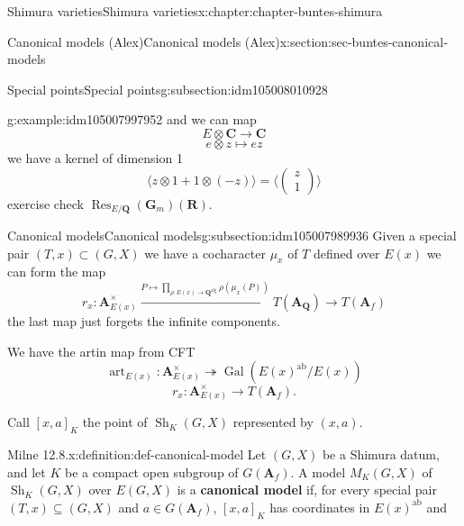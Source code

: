 \documentclass[oneside,10pt,]{book}
\newcommand{\terminology}[1]{\textbf{#1}}
\numberwithin{equation}{section}
\newcommand{\lb}{[}
\newcommand{\rb}{]}
\newcommand{\QQ}{\mathbf{Q}}
\newcommand{\RR}{\mathbf{R}}
\newcommand{\CC}{\mathbf{C}}
\newcommand{\adeles}{\mathbf{A}}
\newcommand{\alg}{\mathrm{alg}}
\newcommand{\ab}{\mathrm{ab}}
\newcommand{\Gal}[2]{\operatorname{Gal}(#1/#2)}
\DeclareMathOperator{\Res}{Res}
\begin{document}
\begin{chapterptx}{Shimura varieties}{}{Shimura varieties}{}{}{x:chapter:chapter-buntes-shimura}
\begin{sectionptx}{Canonical models (Alex)}{}{Canonical models (Alex)}{}{}{x:section:sec-buntes-canonical-models}
\begin{subsectionptx}{Special points}{}{Special points}{}{}{g:subsection:idm105008010928}
\begin{example}{}{g:example:idm105007997952}
and we can map%
\begin{equation*}
E\otimes \CC \to \CC
\end{equation*}
%
\begin{equation*}
e\otimes z \mapsto ez
\end{equation*}
we have a kernel of dimension 1%
\begin{equation*}
\langle z \otimes 1 + 1\otimes (-z) \rangle = \langle \begin{pmatrix} z \\ 1 \end{pmatrix}\rangle
\end{equation*}
exercise check \(\Res_{E/\QQ}(\mathbf G_m)(\RR)\).%
\end{example}
\end{subsectionptx}
%
%
\typeout{************************************************}
\typeout{************************************************}
%
\begin{subsectionptx}{Canonical models}{}{Canonical models}{}{}{g:subsection:idm105007989936}
Given a special pair \((T,x) \subset (G,X)\) we have a cocharacter \(\mu_x\) of \(T\) defined over \(E(x)\) we can form the map%
\begin{equation*}
r_x \colon \adeles^\times_{E(x)} \xrightarrow{ P \mapsto \prod_{\rho \colon E(x) \to \QQ^\alg} \rho(\mu_x(P)) } T(\adeles_\QQ) \to T(\adeles_f)
\end{equation*}
the last map just forgets the infinite components.%
\par
We have the artin map from CFT%
\begin{equation*}
{\operatorname{art}}_{E(x)} \colon \adeles^\times_{E(x)} \twoheadrightarrow \Gal{E(x)^\ab}{E(x)}
\end{equation*}
%
\begin{equation*}
r_x \colon \adeles^\times_{E(x)} \to T(\adeles_f)\text{.}
\end{equation*}
%
\par
Call \(\lb x,a\rb_K\) the point of \({\operatorname{Sh}}_K(G,X)\) represented by \((x,a)\).%
\begin{definition}{Milne 12.8.}{x:definition:def-canonical-model}%
Let \((G,X)\) be a Shimura datum, and let \(K\) be a compact open subgroup of \(G(\adeles_f)\). A model \(M_K(G,X)\) of \({\operatorname{Sh}}_K(G,X)\) over \(E(G,X)\) is a \terminology{canonical model} if, for every special pair \((T, x) \subseteq (G,X)\) and \(a \in G(\adeles_f)\), \(\lb x,a\rb _K\) has coordinates in \(E(x)^\ab\) and%

\end{definition}
\end{subsectionptx}
\end{sectionptx}
\end{chapterptx}
\end{document}
